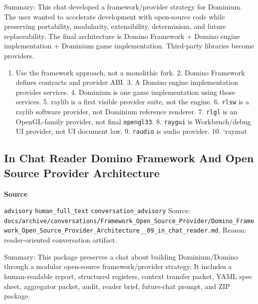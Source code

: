 \documentclass[9pt,a4paper,openany]{book}
\newcommand{\vonecallout}[3]{\par\medskip\noindent\begingroup\setlength{\fboxsep}{7pt}\colorbox{DomCalloutBg}{\parbox{0.94\linewidth}{\textbf{\textcolor{#1}{#2}}\par #3}}\endgroup\par\medskip}
\begin{document}
Summary: This chat developed a framework/\allowbreak{}provider strategy for Dominium.\allowbreak{} The user wanted to accelerate development with open-\allowbreak{}source code while preserving portability, modularity, extensibility, determinism, and future replaceability.\allowbreak{} The final architecture is Domino Framework + Domino engine implementation + Dominium game implementation.\allowbreak{} Third-\allowbreak{}party libraries become providers.\allowbreak{}


\begin{enumerate}
\item Use the framework approach, not a monolithic fork.\allowbreak{} 2.\allowbreak{} Domino Framework defines contracts and provider ABI.\allowbreak{} 3.\allowbreak{} A Domino engine implementation provides services.\allowbreak{} 4.\allowbreak{} Dominium is one game implementation using those services.\allowbreak{} 5.\allowbreak{} raylib is a first visible provider suite, not the engine.\allowbreak{} 6.\allowbreak{} \texttt{rlsw} is a raylib software provider, not Dominium reference renderer.\allowbreak{} 7.\allowbreak{} \texttt{rlgl} is an OpenGL-\allowbreak{}family provider, not final \texttt{opengl33}.\allowbreak{} 8.\allowbreak{} \texttt{raygui} is Workbench/\allowbreak{}debug UI provider, not UI document law.\allowbreak{} 9.\allowbreak{} \texttt{raudio} is audio provider.\allowbreak{} 10.\allowbreak{} `raymat
\end{enumerate}


\subsection{In Chat Reader Domino Framework And Open Source Provider Architecture}

\vonecallout{DomSlate}{Source}{\texttt{advisory} \texttt{human\_\allowbreak{}full\_\allowbreak{}text} \texttt{conversation\_\allowbreak{}advisory} Source: \texttt{docs/\allowbreak{}archive/\allowbreak{}conversations/\allowbreak{}Framework\_\allowbreak{}Open\_\allowbreak{}Source\_\allowbreak{}Provider/\allowbreak{}Domino\_\allowbreak{}Framework\_\allowbreak{}Open\_\allowbreak{}Source\_\allowbreak{}Provider\_\allowbreak{}Architecture\_\allowbreak{}\_\allowbreak{}09\_\allowbreak{}in\_\allowbreak{}chat\_\allowbreak{}reader.\allowbreak{}md}.\allowbreak{} Reason: reader-\allowbreak{}oriented conversation artifact.\allowbreak{}}

Summary: This package preserves a chat about building Dominium/\allowbreak{}Domino through a modular open-\allowbreak{}source framework/\allowbreak{}provider strategy.\allowbreak{} It includes a human-\allowbreak{}readable report, structured registers, context transfer packet, YAML spec sheet, aggregator packet, audit, reader brief, future-\allowbreak{}chat prompt, and ZIP package.\allowbreak{}
\end{document}

